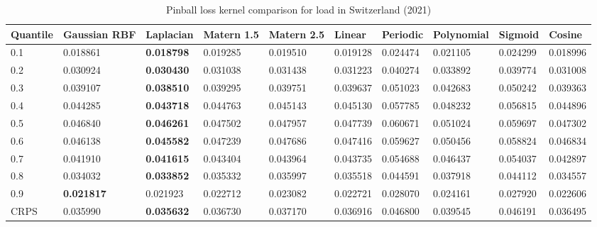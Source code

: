 \begin{table}[!ht]
    \centering
    \caption{Pinball loss kernel comparison for load in Switzerland (2021)}
    \label{tab:secures_met_ch}
    \begin{adjustbox}{width=\textwidth}
        \begin{tabular}{llllllllll}
    \toprule
    Quantile & Gaussian RBF & Laplacian & Matern 1.5 & Matern 2.5 & Linear & Periodic & Polynomial & Sigmoid & Cosine \\
    \midrule
    0.1 & 0.018861 & \textbf{0.018798} & 0.019285 & 0.019510 & 0.019128 & 0.024474 & 0.021105 & 0.024299 & 0.018996 \\
    0.2 & 0.030924 & \textbf{0.030430} & 0.031038 & 0.031438 & 0.031223 & 0.040274 & 0.033892 & 0.039774 & 0.031008 \\
    0.3 & 0.039107 & \textbf{0.038510} & 0.039295 & 0.039751 & 0.039637 & 0.051023 & 0.042683 & 0.050242 & 0.039363 \\
    0.4 & 0.044285 & \textbf{0.043718} & 0.044763 & 0.045143 & 0.045130 & 0.057785 & 0.048232 & 0.056815 & 0.044896 \\
    0.5 & 0.046840 & \textbf{0.046261} & 0.047502 & 0.047957 & 0.047739 & 0.060671 & 0.051024 & 0.059697 & 0.047302 \\
    0.6 & 0.046138 & \textbf{0.045582} & 0.047239 & 0.047686 & 0.047416 & 0.059627 & 0.050456 & 0.058824 & 0.046834 \\
    0.7 & 0.041910 & \textbf{0.041615} & 0.043404 & 0.043964 & 0.043735 & 0.054688 & 0.046437 & 0.054037 & 0.042897 \\
    0.8 & 0.034032 & \textbf{0.033852} & 0.035332 & 0.035997 & 0.035518 & 0.044591 & 0.037918 & 0.044112 & 0.034557 \\
    0.9 & \textbf{0.021817} & 0.021923 & 0.022712 & 0.023082 & 0.022721 & 0.028070 & 0.024161 & 0.027920 & 0.022606 \\
    \midrule
    CRPS & 0.035990 & \textbf{0.035632} & 0.036730 & 0.037170 & 0.036916 & 0.046800 & 0.039545 & 0.046191 & 0.036495 \\
    \bottomrule
    \end{tabular}
\end{adjustbox}
    \end{table}
    


